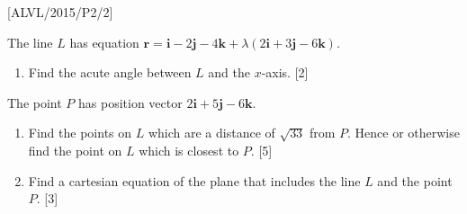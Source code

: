 \item {[}ALVL/2015/P2/2{]}

The line $L$ has equation $\mathbf{r}=\mathbf{i}-2\mathbf{j}-4\mathbf{k}+\lambda\left(2\mathbf{i}+3\mathbf{j}-6\mathbf{k}\right)$. 
\begin{enumerate}
\item Find the acute angle between $L$ and the $x$-axis. \hfill{} {[}2{]}
\end{enumerate}
The point $P$ has position vector $2\mathbf{i}+5\mathbf{j}-6\mathbf{k}$. 
\begin{enumerate}
\item Find the points on $L$ which are a distance of $\sqrt{33}$ from
$P$. Hence or otherwise find the point on $L$ which is closest to
$P$. \hfill{}{[}5{]}
\item Find a cartesian equation of the plane that includes the line $L$
and the point $P$. \hfill{}{[}3{]}
\end{enumerate}
